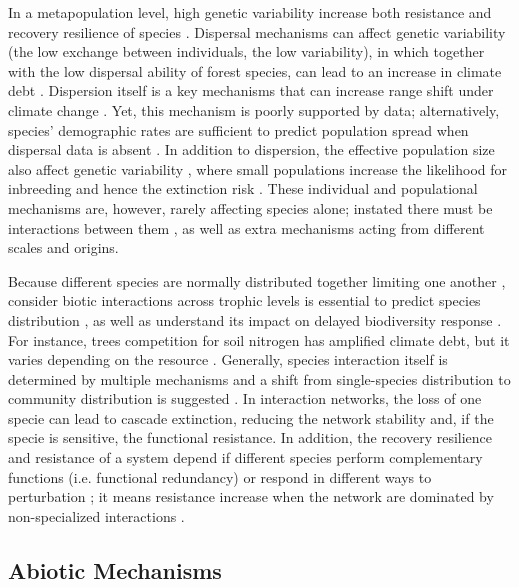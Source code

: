 In a metapopulation level, high genetic variability increase both resistance and recovery resilience of species \parencite{Hylander2013,Oliver2015}.
Dispersal mechanisms can affect genetic variability (the low exchange between individuals, the low variability), in which together with the low dispersal ability of forest species, can lead to an increase in climate debt \parencite{Hylander2013,Bertrand2016}.
Dispersion itself is a key mechanisms that can increase range shift under climate change \parencite{Gonzalez-Varo2017}. Yet, this mechanism is poorly supported by data; alternatively, species’ demographic rates are sufficient to predict population spread when dispersal data is absent \parencite{Hemrova2017}.
In addition to dispersion, the effective population size also affect genetic variability \parencite{Oliver2015}, where small populations increase the likelihood for inbreeding and hence the extinction risk \parencite{Nieminen2001}.
These individual and populational mechanisms are, however, rarely affecting species alone; instated there must be interactions between them \parencite{Hylander2013}, as well as extra mechanisms acting from different scales and origins.

Because different species are normally distributed together limiting one another \parencite{Clark2014a}, consider biotic interactions across trophic levels is essential to predict species distribution \parencite{VanderPutten2010}, as well as understand its impact on delayed biodiversity response \parencite{Essl2015}.
For instance, trees competition for soil nitrogen has amplified climate debt, but it varies depending on the resource \parencite{Bertrand2016}.
Generally, species interaction itself is determined by multiple mechanisms \parencite[for an overview]{Louthan2015} and a shift from single-species distribution to community distribution is suggested \parencite{Cazelles2016}.
In interaction networks, the loss of one specie can lead to cascade extinction, reducing the network stability \parencite{Dunne2002} and, if the specie is sensitive, the functional resistance.
In addition, the recovery resilience and resistance of a system depend if different species perform complementary functions (i.e. functional redundancy) or respond in different ways to perturbation \parencite{Winfree2009}; it means resistance increase when the network are dominated by non-specialized interactions \parencite{Oliver2015}.

\subsection{Abiotic Mechanisms}

